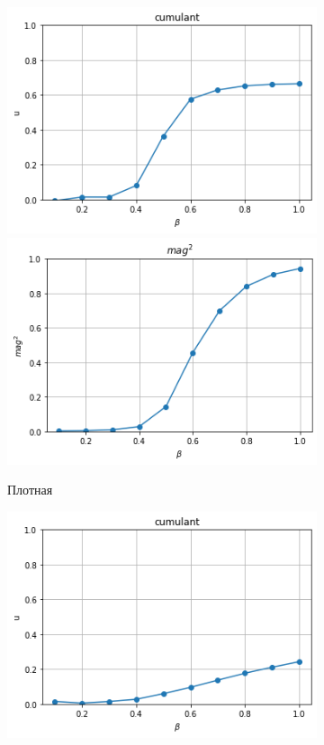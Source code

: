 \begin{figure}[h]
	\centering
	\begin{subfigure}[t]{0.48\textwidth}
		\includegraphics[width=\textwidth]{../images/dense_cumulant.png} 
		\includegraphics[width=\textwidth]{../images/dense_magnetization.png} 
		\caption{Плотная}
	\end{subfigure}
	\begin{subfigure}[t]{0.48\textwidth}
		\includegraphics[width=\textwidth]{../images/loose_cumulant.png} 

\end{subfigure}
\end{figure}
